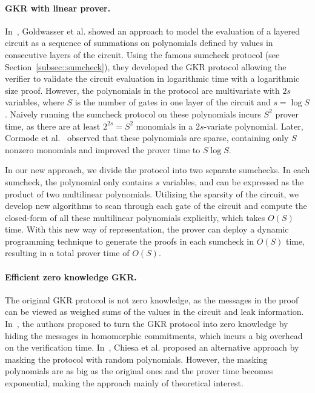 \paragraph{GKR with linear prover.} In~\cite{GKR}, Goldwasser et al. showed an approach to model the evaluation of a layered circuit as a sequence of summations on polynomials defined by values in consecutive layers of the circuit. Using the famous sumcheck protocol (see Section~\ref{subsec::sumcheck}), they developed the GKR protocol allowing the verifier to validate the circuit evaluation in logarithmic time with a logarithmic size proof. However, the polynomials in the protocol are multivariate with $2s$ variables, where $S$ is the number of gates in one layer of the circuit and $s = \log S$. Naively running the sumcheck protocol on these polynomials incurs $S^2$ prover time, as there are at least $2^{2s}=S^2$ monomials in a $2s$-variate polynomial. Later, Cormode et al.~\cite{CMT} observed that these polynomials are sparse, containing only $S$ nonzero monomials and improved the prover time to $S\log S$.

In our new approach, we divide the protocol into two separate sumchecks. In each sumcheck, the polynomial only contains $s$ variables, and can be expressed as the product of two multilinear polynomials. Utilizing the sparsity of the circuit, we develop new algorithms to scan through each gate of the circuit and compute the closed-form of all these multilinear polynomials explicitly, which takes $O(S)$ time. With this new way of representation, the prover can deploy a dynamic programming technique to generate the proofs in each sumcheck in $O(S)$ time, resulting in a total prover time of $O(S)$. 

\paragraph{Efficient zero knowledge GKR.} The original GKR protocol is not zero knowledge, as the messages in the proof can be viewed as weighed sums of the values in the circuit and leak information. In~\cite{zkvpd,hyrax}, the authors proposed to turn the GKR protocol into zero knowledge by hiding the messages in homomorphic commitments, which incurs a big overhead on the verification time. In~\cite{zksumcheck}, Chiesa et al. proposed an alternative approach by masking the protocol with random polynomials. However, the masking polynomials are as big as the original ones and the prover time becomes exponential, making the approach mainly of theoretical interest. 

